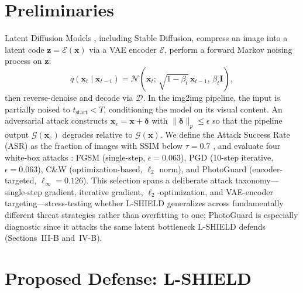 \documentclass[conference]{IEEEtran}
\begin{document}
\section{Preliminaries}

Latent Diffusion Models \cite{ho2020denoising,rombach2022high}, including
Stable Diffusion, compress an image into a latent code
$\mathbf{z}\!=\!\mathcal{E}(\mathbf{x})$ via a VAE encoder $\mathcal{E}$,
perform a forward Markov noising process on $\mathbf{z}$:
\begin{equation}
  q(\mathbf{x}_t \mid \mathbf{x}_{t-1}) =
  \mathcal{N}\!\left(\mathbf{x}_t;\,\sqrt{1-\beta_t}\,\mathbf{x}_{t-1},\,
  \beta_t \mathbf{I}\right),
\end{equation}
then reverse-denoise and decode via $\mathcal{D}$. In the img2img pipeline,
the input is partially noised to $t_{\text{start}} < T$, conditioning the
model on its visual content. An adversarial attack constructs
$\mathbf{x}_e = \mathbf{x} + \boldsymbol{\delta}$ with
$\|\boldsymbol{\delta}\|_p \leq \epsilon$ so that the pipeline output
$\mathcal{G}(\mathbf{x}_e)$ degrades relative to $\mathcal{G}(\mathbf{x})$.
We define the Attack Success Rate (ASR) as the fraction of images with SSIM
below $\tau\!=\!0.7$ \cite{salman2023raising}, and evaluate four white-box
attacks \cite{costa2024deep}: FGSM \cite{goodfellow2015explaining} (single-step,
$\epsilon\!=\!0.063$), PGD \cite{madry2018towards} (10-step iterative,
$\epsilon\!=\!0.063$), C\&W \cite{carlini2017evaluating} (optimization-based,
$\ell_2$ norm), and PhotoGuard \cite{salman2023raising} (encoder-targeted,
$\ell_\infty\!=\!0.126$).
This selection spans a deliberate attack taxonomy---single-step gradient, iterative
gradient, $\ell_2$-optimization, and VAE-encoder targeting---stress-testing
whether L-SHIELD generalizes across fundamentally different threat strategies
rather than overfitting to one; PhotoGuard is especially diagnostic since it attacks
the same latent bottleneck L-SHIELD defends (Sections~III-B and~IV-B).

\section{Proposed Defense: L-SHIELD}
\enlargethispage{30pt}
\end{document}
